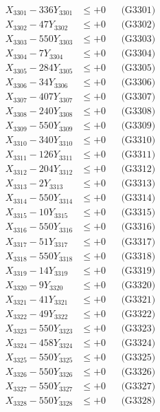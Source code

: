 \documentclass[a4paper,10pt]{article}
\begin{document}
{\begin{align}
\allowbreak
X_{3301} - 336Y_{3301} &\leq +0 && \text{(G3301)} \\
X_{3302} - 47Y_{3302} &\leq +0 && \text{(G3302)} \\
X_{3303} - 550Y_{3303} &\leq +0 && \text{(G3303)} \\
X_{3304} - 7Y_{3304} &\leq +0 && \text{(G3304)} \\
X_{3305} - 284Y_{3305} &\leq +0 && \text{(G3305)} \\
X_{3306} - 34Y_{3306} &\leq +0 && \text{(G3306)} \\
X_{3307} - 407Y_{3307} &\leq +0 && \text{(G3307)} \\
X_{3308} - 240Y_{3308} &\leq +0 && \text{(G3308)} \\
X_{3309} - 550Y_{3309} &\leq +0 && \text{(G3309)} \\
X_{3310} - 340Y_{3310} &\leq +0 && \text{(G3310)} \\
\allowbreak
X_{3311} - 126Y_{3311} &\leq +0 && \text{(G3311)} \\
X_{3312} - 204Y_{3312} &\leq +0 && \text{(G3312)} \\
X_{3313} - 2Y_{3313} &\leq +0 && \text{(G3313)} \\
X_{3314} - 550Y_{3314} &\leq +0 && \text{(G3314)} \\
X_{3315} - 10Y_{3315} &\leq +0 && \text{(G3315)} \\
X_{3316} - 550Y_{3316} &\leq +0 && \text{(G3316)} \\
X_{3317} - 51Y_{3317} &\leq +0 && \text{(G3317)} \\
X_{3318} - 550Y_{3318} &\leq +0 && \text{(G3318)} \\
X_{3319} - 14Y_{3319} &\leq +0 && \text{(G3319)} \\
X_{3320} - 9Y_{3320} &\leq +0 && \text{(G3320)} \\
\allowbreak
X_{3321} - 41Y_{3321} &\leq +0 && \text{(G3321)} \\
X_{3322} - 49Y_{3322} &\leq +0 && \text{(G3322)} \\
X_{3323} - 550Y_{3323} &\leq +0 && \text{(G3323)} \\
X_{3324} - 458Y_{3324} &\leq +0 && \text{(G3324)} \\
X_{3325} - 550Y_{3325} &\leq +0 && \text{(G3325)} \\
X_{3326} - 550Y_{3326} &\leq +0 && \text{(G3326)} \\
X_{3327} - 550Y_{3327} &\leq +0 && \text{(G3327)} \\
X_{3328} - 550Y_{3328} &\leq +0 && \text{(G3328)} \\

\end{align}}
\end{document}

